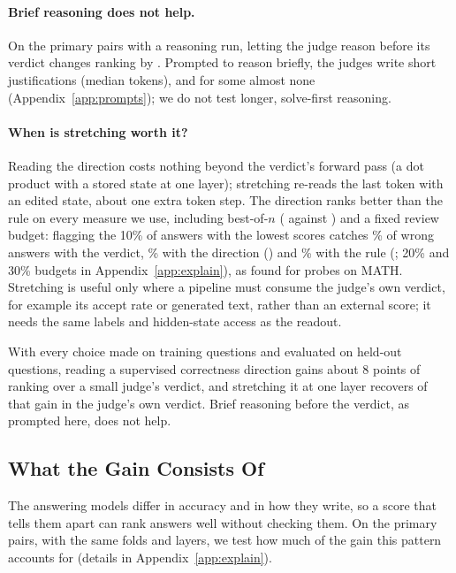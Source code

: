 \documentclass[11pt]{article}
\newcounter{takeaway}
\begin{document}
\paragraph{Brief reasoning does not help.} On the  primary pairs with a reasoning run, letting the judge reason before its verdict changes ranking by . Prompted to reason briefly, the judges write short justifications (median  tokens), and for some almost none (Appendix~\ref{app:prompts}); we do not test longer, solve-first reasoning.

\paragraph{When is stretching worth it?} Reading the direction costs nothing beyond the verdict's forward pass (a dot product with a stored state at one layer); stretching re-reads the last token with an edited state, about one extra token step. The direction ranks better than the rule on every measure we use, including best-of-$n$ ( against ) and a fixed review budget: flagging the 10\% of answers with the lowest scores catches \% of wrong answers with the verdict, \% with the direction () and \% with the rule (; 20\% and 30\% budgets in Appendix~\ref{app:explain}), as \citet{gulati2026auditing} found for probes on MATH. Stretching is useful only where a pipeline must consume the judge's own verdict, for example its accept rate or generated text, rather than an external score; it needs the same labels and hidden-state access as the readout.

\begin{takeaway}
With every choice made on training questions and evaluated on held-out questions, reading a supervised correctness direction gains about 8 points of ranking over a small judge's verdict, and stretching it at one layer recovers  of that gain in the judge's own verdict. Brief reasoning before the verdict, as prompted here, does not help.
\end{takeaway}

\subsection{What the Gain Consists Of}
\label{sec:what}

The answering models differ in accuracy and in how they write, so a score that tells them apart can rank answers well without checking them. On the primary pairs, with the same folds and layers, we test how much of the gain this pattern accounts for (details in Appendix~\ref{app:explain}).
\end{document}
